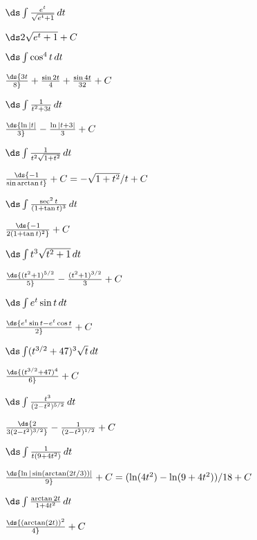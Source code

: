 \begin{exercises}
\exercise $\ds\int {e^t\over \sqrt{e^t+1}}\,dt$
\begin{answer} $\ds 2\sqrt{e^t+1}+C$
\end{answer}

\exercise $\ds\int \cos^4 t\,dt$
\begin{answer} $\ds{3t\over 8}+{\sin 2t\over4}+ {\sin 4t\over 32}+C$
\end{answer}

\exercise $\ds\int {1\over t^2+3t}\,dt$
\begin{answer} $\ds{\ln |t|\over 3} - {\ln |t+3|\over 3}+C$
\end{answer}

\exercise $\ds\int {1\over t^2\sqrt{1+t^2}}\,dt$
\begin{answer} $\ds{-1\over \sin\arctan t}+C=-\sqrt{1+t^2}/t+C$
\end{answer}

\exercise $\ds\int {\sec^2t\over (1+\tan t)^3}\,dt$
\begin{answer} $\ds{-1\over 2(1+\tan t)^2}+C$
\end{answer}

\exercise $\ds\int t^3\sqrt{t^2+1}\,dt$
\begin{answer} $\ds{(t^2+1)^{5/2}\over 5}-{(t^2+1)^{3/2}\over 3}+C$
\end{answer}

\exercise $\ds\int e^t\sin t\,dt$
\begin{answer} $\ds{e^t\sin t-e^t\cos t\over 2}+C$
\end{answer}

\exercise $\ds\int (t^{3/2}+47)^3\sqrt{t}\,dt$
\begin{answer} $\ds{(t^{3/2}+47)^4\over6}+C$
\end{answer}

\exercise $\ds\int {t^3\over (2-t^2)^{5/2}}\,dt$
\begin{answer} $\ds{2\over 3(2-t^2)^{3/2}}-{1\over(2-t^2)^{1/2}}+C$
\end{answer}

\exercise $\ds\int {1\over t(9+4t^2)}\,dt$
\begin{answer} $\ds{\ln|\sin(\arctan(2t/3))|\over9}+C = 
(\ln(4t^2)-\ln(9+4t^2))/18 + C$
\end{answer}

\exercise $\ds\int {\arctan 2t\over 1+4t^2}\,dt$
\begin{answer} $\ds{(\arctan(2t))^2\over4}+C$
\end{answer}


\end{exercises}
